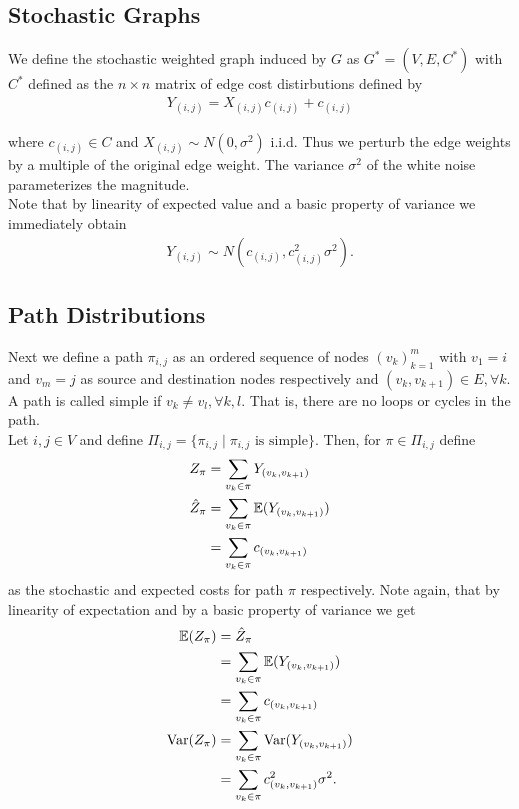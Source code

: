 \documentclass[twocolumn]{article}
\begin{document}
\subsection{Stochastic Graphs}
We define the stochastic weighted graph induced by $G$ as $G^{\ast} = (V, E,C^{\ast} )$ with $C^{\ast}$  defined as the $n \times n$ matrix of edge cost distirbutions defined by 
\begin{gather}
Y_{(i,j)} = X_{(i,j)}c_{(i,j)} + c_{(i,j)}
\end{gather}

where $c_{(i,j)} \in C$ and $X_{(i,j)} \sim N(0,\sigma^{2})$  i.i.d. Thus we perturb the edge weights by a multiple of the original edge weight. The variance $\sigma^{2}$ of the white noise parameterizes the magnitude. \\

Note that by linearity of expected value and a basic property of variance we immediately obtain
\begin{gather}
Y_{(i,j)} \sim  N(c_{(i,j)},c_{(i,j)}^{2}\sigma^{2}).
\end{gather}


\subsection{Path Distributions}
Next we define a path $\pi_{i,j}$ as an ordered sequence of nodes $(v_{k})_{k=1}^{m}$ with $v_{1}=i$ and $v_{m}=j$  as source and destination nodes respectively and  $(v_{k},v_{k+1}) \in E,  \forall k$. A path is called simple if $v_{k} \ne v_{l}, \forall  k,l$. That is, there are no loops or cycles in the path. \\

Let $i,j \in V$ and define $\Pi_{i,j} =  \{ \pi_{i,j} \mid \pi_{i,j}  \text{ is simple}\}$. Then, for $\pi \in \Pi_{i,j}$ define
\begin{align}
Z_{\pi} & = \sum_{v_{k} \in \pi} Y_{(v_{k},v_{k+1})} \\
\hat{Z}_{\pi} & = \sum_{v_{k} \in \pi} {{\mathbb E}}(Y_{(v_{k},v_{k+1})}) \notag \\
& = \sum_{v_{k} \in \pi} c_{(v_{k},v_{k+1})}
\end{align}
as the stochastic and expected costs for path $\pi$ respectively. Note again, that by linearity of expectation and by a basic property of variance we get 
\begin{align}
 {{\mathbb E}}(Z_{\pi}) & =\hat{Z}_{\pi}  \notag \\
 & = \sum_{v_{k} \in \pi}  {{\mathbb E}}(Y_{(v_{k},v_{k+1})})   \notag \\
 & = \sum_{v_{k} \in \pi} c_{(v_{k},v_{k+1})}   \notag \\
\operatorname {Var}(Z_{\pi}) & = \sum_{v_{k} \in \pi} \operatorname {Var}(Y_{(v_{k},v_{k+1})})  \notag \\
& = \sum_{v_{k} \in \pi} c_{(v_{k},v_{k+1})}^{2}\sigma^{2}.  \notag
\end{align}
\end{document}
